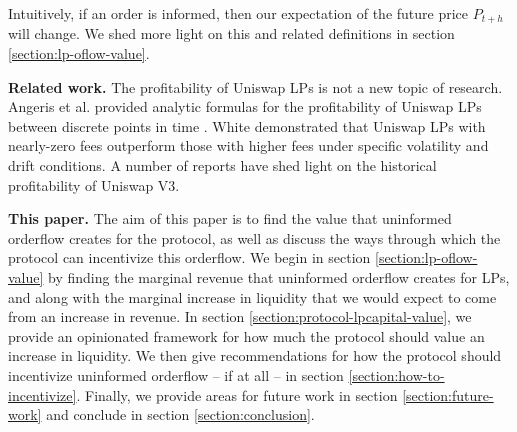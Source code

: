     Intuitively, if an order is informed, then our expectation of the future price $P_{t+h}$ will change. We shed more light on this and related definitions in section \ref{section:lp-oflow-value}.

    \textbf{Related work.}
    The profitability of Uniswap LPs is not a new topic of research. 
    Angeris et al. provided analytic formulas for the profitability of Uniswap LPs between discrete points in time \cite{angeris2019analysis}. %
    White demonstrated that Uniswap LPs with nearly-zero fees outperform those with higher fees under specific volatility and drift conditions. %
    A number of reports have shed light on the historical profitability of Uniswap V3. %

    \textbf{This paper.} The aim of this paper is to find the value that uninformed orderflow creates for the protocol, as well as discuss the ways through which the protocol can incentivize this orderflow.
    We begin in section \ref{section:lp-oflow-value} 
    by finding the marginal revenue that uninformed orderflow creates for LPs, and along with the marginal increase in liquidity that we would expect to come from an increase in revenue. In section \ref{section:protocol-lpcapital-value}, we provide an opinionated framework for how much the protocol should value an increase in liquidity.
    We then give recommendations for how the protocol should incentivize uninformed orderflow -- if at all -- in section \ref{section:how-to-incentivize}. Finally, we provide areas for future work in section \ref{section:future-work} and conclude in section \ref{section:conclusion}.
